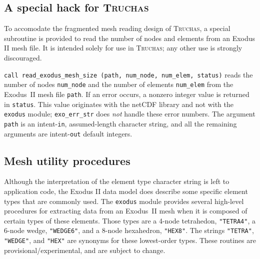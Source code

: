 \documentclass[oneside,12pt]{amsart}
\newenvironment{mydesc}%
  {\begin{list}{}{%
    \setlength{\labelsep}{0pt}%
    \setlength{\itemindent}{-\leftmargin}%
    \setlength{\itemsep}{\parskip}%
    \setlength{\listparindent}{0pt}\setlength{\parsep}{\parskip}}}
  {\end{list}}
\begin{document}
\subsection{A special hack for \textsc{Truchas}}
To accomodate the fragmented mesh reading design of \textsc{Truchas}, a 
special subroutine is provided to read the number of nodes and elements
from an Exodus II mesh file.  It is intended solely for use in
\textsc{Truchas}; any other use is strongly discouraged.
\begin{mydesc}
\item \texttt{call read_exodus_mesh_size (path, num_node, num_elem, status)}
  reads the number of nodes \texttt{num_node} and the number of elements
  \texttt{num_elem} from the Exodus~II mesh file \texttt{path}.  If an error
  occurs, a nonzero integer value is returned in \texttt{status}.  This value
  originates with the netCDF library and not with the \texttt{exodus} module;
  \texttt{exo_err_str} does \emph{not} handle these error numbers.  The
  argument \texttt{path} is an intent-\texttt{in}, assumed-length character
  string, and all the remaining arguments are intent-\texttt{out} default
  integers.
\end{mydesc}

\subsection{Mesh utility procedures}
Although the interpretation of the element type character string is left to
application code, the Exodus II data model \cite{exodusII} does describe
some specific element types that are commonly used.  The \texttt{exodus}
module provides several high-level procedures for extracting data from an
Exodus~II mesh when it is composed of certain types of these elements.  Those
types are a 4-node tetrahedon, \texttt{"TETRA4"}, a 6-node wedge, \texttt{"WEDGE6"},
and a 8-node hexahedron, \texttt{"HEX8"}.  The strings \texttt{"TETRA"},
\texttt{"WEDGE"}, and \texttt{"HEX"} are synonyms for these lowest-order types.
These routines are provisional/experimental, and are subject to change.
\end{document}
